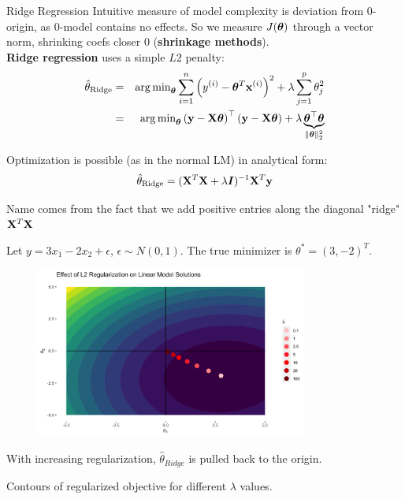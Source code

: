 \documentclass[11pt,compress,t,notes=noshow, xcolor=table]{beamer}
\begin{document}
\begin{vbframe}{Ridge Regression}
Intuitive measure of model complexity is deviation from 0-origin, as 0-model contains no effects. %
So we measure $J(\bm{\theta})$ through a vector norm, shrinking coefs closer 0 (\textbf{shrinkage methods}).\\
\vspace{0.2cm}
\textbf{Ridge regression} uses a simple $L2$ penalty:
\begin{eqnarray*}  
\hat{\theta}_{\text{Ridge}} &=& \operatorname{arg\,min}_{\bm{\theta}} \sum\limits_{i=1}^n \left(y^{(i)} - \bm{\theta}^T \mathbf{x}^{(i)} \right)^2 + \lambda \sum_{j=1}^{p} \theta_j^2 \\
&=& \operatorname{arg\,min}_{\bm{\theta}} \left(\mathbf{y} - \mathbf{X} \bm{\theta}\right)^\top \left(\mathbf{y} - \mathbf{X} \bm{\theta}\right) + \lambda \underbrace{\bm{\theta}^\top \bm{\theta}}_{\|\bm{\theta}\|_2^2}
\end{eqnarray*}

Optimization is possible (as in the normal LM) in analytical form:
$$\hat{\theta}_{\text{Ridge}} = ({\mathbf{X}}^T \mathbf{X}  + \lambda \boldsymbol{I})^{-1} \mathbf{X}^T\mathbf{y}$$

Name comes from the fact that we add positive entries along the diagonal "ridge" $\mathbf{X}^T \mathbf{X}$

\framebreak 

Let $y=3x_{1} -2x_{2} +\epsilon $, $ \epsilon \sim N( 0,1)$. The true minimizer is $\theta ^{*} =( 3,-2)^{T}$.

\begin{figure}
\includegraphics[width=0.8\textwidth]{figure/lin_reg_l2.png}
\end{figure}
With increasing regularization, $\hat{\theta}_{\textit{Ridge}}$ is pulled back to the origin.

\framebreak 
Contours of regularized objective for different $\lambda$ values.


\end{vbframe}
\end{document}
